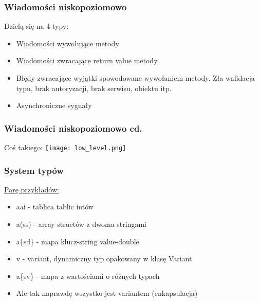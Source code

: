 \begin{frame}
    \frametitle{Wiadomości niskopoziomowo}
    Dzielą się na 4 typy:
    \begin{itemize}
        \item Wiadomości wywołujące metody
        \item Wiadomości zwracające return value metody
        \item Błędy zwracające wyjątki spowodowane 
        wywołaniem metody. Zła walidacja typu, 
        brak autoryzacji, brak serwisu, obiektu itp.
        \item Asynchroniczne sygnały
    \end{itemize}
\end{frame}

\begin{frame}
    \frametitle{Wiadomości niskopoziomowo cd.}
    Coś takiego:
    \texttt{[image: low\_level.png]}
\end{frame}

\begin{frame}
    \frametitle{System typów}
    \href{https://dbus.freedesktop.org/doc/dbus-specification.html}{Parę przykładów:}
    \begin{itemize}
        \item aai - tablica tablic intów \pause
        \item a(ss) - array structów z dwoma stringami \pause
        \item a\{sd\} - mapa klucz-string value-double \pause
        \item v - variant, dynamiczny typ opakowany w klasę Variant \pause
        \item a\{sv\} - mapa z wartościami o różnych typach \pause
        \item Ale tak naprawdę wszystko jest variantem (enkapsulacja)
    \end{itemize}
\end{frame}





